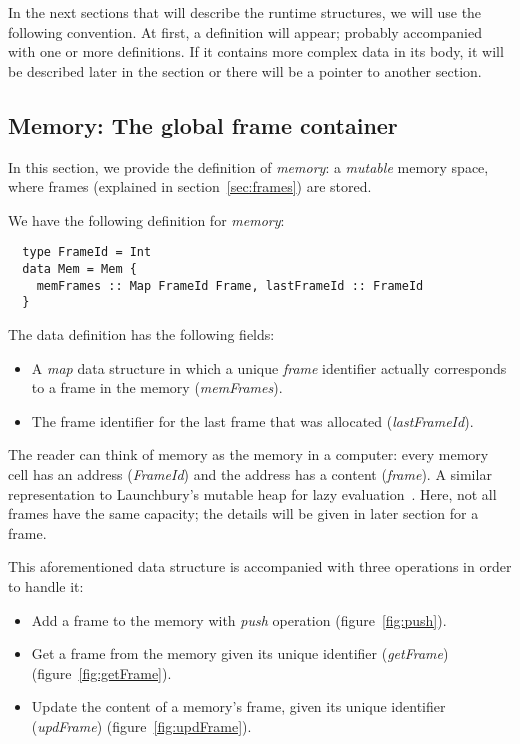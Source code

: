 \documentclass[diploma]{softlab-thesis}
\begin{document}
In the next sections that will describe the runtime structures, we will use the following convention. At first, a definition 
will appear; probably accompanied with one or more definitions. If it contains more complex data in its body, it will be 
described later in the section or there will be a pointer to another section.

\subsection{Memory: The global frame container}

In this section, we provide the definition of \textit{memory}: 
a \textit{mutable} memory space, where frames (explained in section~\ref{sec:frames}) are stored.

We have the following definition for \textit{memory}:
\begin{verbatim}
  type FrameId = Int
  data Mem = Mem {
    memFrames :: Map FrameId Frame, lastFrameId :: FrameId
  }
\end{verbatim}

The data definition has the following fields:
\begin{itemize}
  \item A \textit{map} data structure in which a unique \textit{frame} identifier actually corresponds to 
  a frame in the memory (\textit{memFrames}). 
  \item The frame identifier for the last frame that was allocated (\textit{lastFrameId}).
\end{itemize}

The reader can think of memory as the memory in a computer: every memory cell has an address (\textit{FrameId}) and 
the address has a content (\textit{frame}). A similar representation to Launchbury's mutable heap for 
lazy evaluation~\cite{La93}.
Here, not all frames have the same capacity; the details will be given in later section for a frame.

This aforementioned data structure is accompanied with three operations in order to handle it:
\begin{itemize}
  \item Add a frame to the memory with \textit{push} operation (figure~\ref{fig:push}).
  \item Get a frame from the memory given its unique identifier (\textit{getFrame})
  (figure~\ref{fig:getFrame}).
  \item Update the content of a memory's frame, given its unique identifier (\textit{updFrame})
  (figure~\ref{fig:updFrame}).
\end{itemize}
\end{document}

